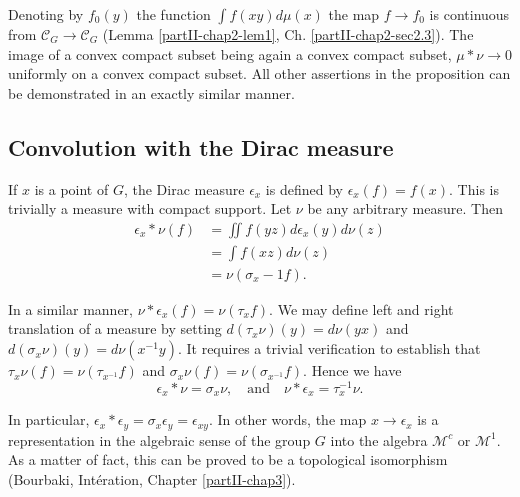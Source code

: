 Denoting by $f_0(y)$ the function $\int f(xy) d \mu(x)$ the map
$f\rightarrow f_0$ is continuous from $\mathscr{C}_G \rightarrow
\mathscr{C}_G$ (Lemma \ref{partII-chap2-lem1},
Ch. \ref{partII-chap2-sec2.3}). The image of 
a convex compact 
subset being again a convex compact subset, $\mu* \nu \rightarrow 0$
uniformly on a convex compact subset. All other assertions in the
proposition can be demonstrated in an exactly similar manner. 

\subsection{Convolution with the Dirac
  measure}\label{partII-chap2-sec2.5}%

If $x$ is a point of $G$, the Dirac measure $\epsilon_x$ is defined by
$\epsilon_x(f)=f(x)$. This is trivially a measure with compact support. Let
$\nu$ be any arbitrary measure. Then 
\begin{align*}
\epsilon_x * \nu(f) & = \iint f(yz) d \epsilon_x(y) d\nu(z)\\
&=\int f(xz) d \nu(z)\\
&=\nu(\sigma_x  -1 f).
\end{align*}

In a similar manner, $\nu* \epsilon_x (f) = \nu(\tau_x f)$. We may define
left and right translation of a measure by setting $d(\tau_x \nu)(y) =
d \nu(yx)$ and $d(\sigma_x \nu)(y)=d\nu (x^{-1}y)$. It requires a
trivial verification to establish that\pageoriginale $\tau_x\nu
(f)=\nu(\tau_{x^{-1}} f)$ and $\sigma_x\nu(f)=\nu(\sigma_{x^{-1}}
f)$. Hence we have 
$$
\epsilon_x *  \nu  =  \sigma_x \nu ,\quad \text{and}\quad  
\nu * \epsilon_x = \tau_x^{-1} \nu.
$$ 

In particular, $\epsilon_x * \epsilon_y = \sigma_x \epsilon_y =
\epsilon_{xy}$. In other 
words, the map $x\rightarrow \epsilon_x$ is a representation in the
algebraic sense of the group $G$ into the algebra $\mathscr{M}^c$ or
$\mathscr{M}^1$. As 
a matter of fact, this can be proved to be a topological isomorphism
(Bourbaki, Int\'eration, Chapter \ref{partII-chap3}).  




